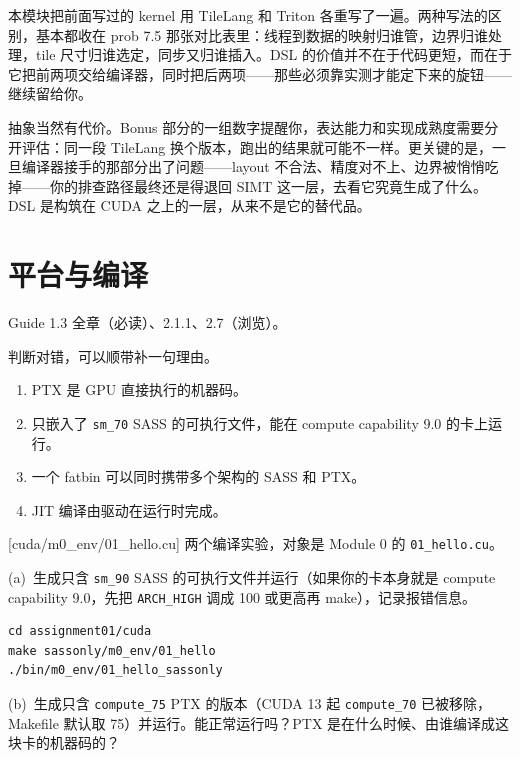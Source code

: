 \documentclass[11pt,a4paper,fontset=none]{ctexart}
\begin{document}
\begin{lookback}
本模块把前面写过的 kernel 用 TileLang 和 Triton 各重写了一遍。两种写法的区别，基本都收在 prob 7.5 那张对比表里：线程到数据的映射归谁管，边界归谁处理，tile 尺寸归谁选定，同步又归谁插入。DSL 的价值并不在于代码更短，而在于它把前两项交给编译器，同时把后两项——那些必须靠实测才能定下来的旋钮——继续留给你。

抽象当然有代价。Bonus 部分的一组数字提醒你，表达能力和实现成熟度需要分开评估：同一段 TileLang 换个版本，跑出的结果就可能不一样。更关键的是，一旦编译器接手的那部分出了问题——layout 不合法、精度对不上、边界被悄悄吃掉——你的排查路径最终还是得退回 SIMT 这一层，去看它究竟生成了什么。DSL 是构筑在 CUDA 之上的一层，从来不是它的替代品。
\end{lookback}

\section{平台与编译}

\begin{reading}
Guide 1.3 全章（必读）、2.1.1、2.7（浏览）。
\end{reading}

判断对错，可以顺带补一句理由。
\begin{enumerate}[label=(\alph*)]
  \item PTX 是 GPU 直接执行的机器码。
  \item 只嵌入了 \texttt{sm\_70} SASS 的可执行文件，能在 compute capability 9.0 的卡上运行。
  \item 一个 fatbin 可以同时携带多个架构的 SASS 和 PTX。
  \item JIT 编译由驱动在运行时完成。
\end{enumerate}

[cuda/m0\_env/01\_hello.cu]
两个编译实验，对象是 Module 0 的 \texttt{01\_hello.cu}。

(a)~生成只含 \texttt{sm\_90} SASS 的可执行文件并运行（如果你的卡本身就是 compute capability 9.0，先把 \texttt{ARCH\_HIGH} 调成 100 或更高再 make），记录报错信息。

\begin{lstlisting}
cd assignment01/cuda
make sassonly/m0_env/01_hello
./bin/m0_env/01_hello_sassonly
\end{lstlisting}

(b)~生成只含 \texttt{compute\_75} PTX 的版本（CUDA 13 起 \texttt{compute\_70} 已被移除，Makefile 默认取 75）并运行。能正常运行吗？PTX 是在什么时候、由谁编译成这块卡的机器码的？
\end{document}

